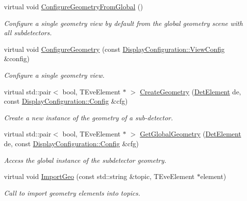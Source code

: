 \begin{DoxyCompactItemize}
virtual void \hyperlink{class_d_d4hep_1_1_view_a2bf3fea77f89710cbccb03dbf8398501}{ConfigureGeometryFromGlobal} ()
\begin{DoxyCompactList}\small\item\em Configure a single geometry view by default from the global geometry scene with all subdetectors. \item\end{DoxyCompactList}\item 
virtual void \hyperlink{class_d_d4hep_1_1_view_adefb4cb817819ec62803d34b89bf0988}{ConfigureGeometry} (const \hyperlink{class_d_d4hep_1_1_display_configuration_1_1_view_config}{DisplayConfiguration::ViewConfig} \&config)
\begin{DoxyCompactList}\small\item\em Configure a single geometry view. \item\end{DoxyCompactList}\item 
virtual std::pair$<$ bool, TEveElement $\ast$ $>$ \hyperlink{class_d_d4hep_1_1_view_aa2325d2c428a2d2523bfb82cd31b7a28}{CreateGeometry} (\hyperlink{class_d_d4hep_1_1_geometry_1_1_det_element}{DetElement} de, const \hyperlink{class_d_d4hep_1_1_display_configuration_1_1_config}{DisplayConfiguration::Config} \&cfg)
\begin{DoxyCompactList}\small\item\em Create a new instance of the geometry of a sub-\/detector. \item\end{DoxyCompactList}\item 
virtual std::pair$<$ bool, TEveElement $\ast$ $>$ \hyperlink{class_d_d4hep_1_1_view_aeb658c5dde010976060874d2ad48107f}{GetGlobalGeometry} (\hyperlink{class_d_d4hep_1_1_geometry_1_1_det_element}{DetElement} de, const \hyperlink{class_d_d4hep_1_1_display_configuration_1_1_config}{DisplayConfiguration::Config} \&cfg)
\begin{DoxyCompactList}\small\item\em Access the global instance of the subdetector geometry. \item\end{DoxyCompactList}\item 
virtual void \hyperlink{class_d_d4hep_1_1_view_acd52a375e0d79ab3421a8026b7a14652}{ImportGeo} (const std::string \&topic, TEveElement $\ast$element)
\begin{DoxyCompactList}\small\item\em Call to import geometry elements into topics. \item\end{DoxyCompactList}\item 

\end{DoxyCompactItemize}
